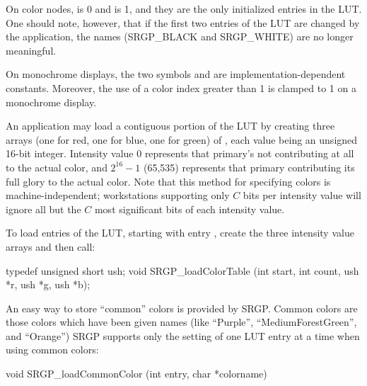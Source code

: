 
\newpar
On color nodes,  is 0 and  is 1, and they
are the only initialized entries in the LUT.  One should note, however, that if
the first two entries of the LUT are changed by the application, the names
(SRGP\_BLACK and SRGP\_WHITE) are no longer meaningful.

\newpar
On monochrome displays, the two symbols  and 
 are
implementation-dependent constants.  Moreover, the use of a color index greater
than 1 is clamped to 1 on a monochrome display.

\newpar
An application may load a contiguous portion of the LUT by creating three
arrays (one for red, one for blue, one for green) of ,
each value being an unsigned 16-bit integer.  Intensity value 0 represents that
primary's not contributing at all to the actual color, and $2^{16}-1$ (65,535)
represents that primary contributing its full glory to the actual color.
Note that this method for specifying colors is machine-independent;
workstations supporting only $C$ bits per intensity value will ignore all but
the $C$ most significant bits of each intensity value.

\newpar
To load  entries of the LUT, starting with entry
, create the three intensity value arrays and then call:

\begincode
typedef unsigned short ush;
void SRGP_loadColorTable (int start, int count, ush *r, ush *g, ush *b);
\endcode

\newpar
An easy way to store ``common'' colors is provided by SRGP.  Common colors are
those colors which have been given names (like ``Purple'',
``MediumForestGreen'', and ``Orange'') 
  SRGP supports only the setting of one
LUT entry at a time when using common colors:

\begincode
void SRGP_loadCommonColor (int entry, char *colorname)
\endcode


